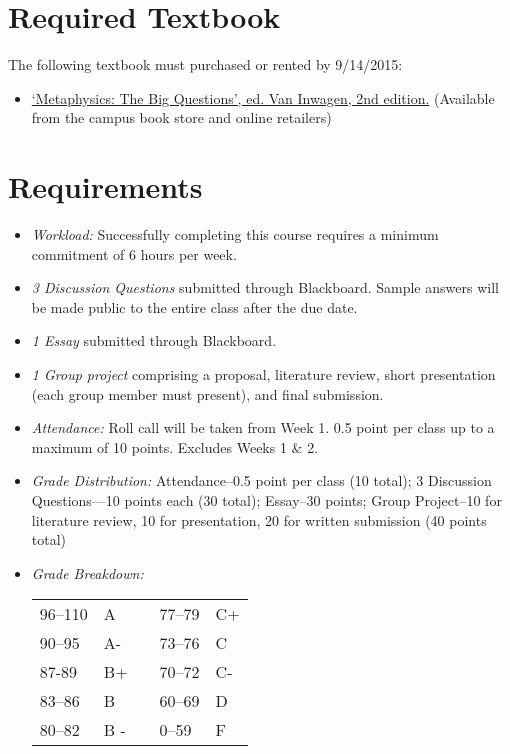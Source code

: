 \documentclass[11pt,article,oneside]{memoir}
\begin{document}
\section{Required Textbook}

The following textbook must purchased or rented by 9/14/2015:

\begin{itemize}
\item
\href{http://www.amazon.com/Metaphysics-Questions-Peter-van-Inwagen/dp/1405125861/ref=sr_1_1?ie=UTF8&qid=1440685163&sr=8-1&keywords=metaphysics+big+questions}{`Metaphysics: The Big Questions', ed. Van Inwagen, 2nd edition.} (Available from the campus book store and online retailers)
\end{itemize}

\section{Requirements}

\begin{itemize}
\item \textit{Workload:} Successfully completing this course requires a minimum commitment of 6 hours per week. 


\item \textit{3 Discussion Questions} submitted through Blackboard. Sample answers will be made public to the entire class after the due date. 

\item \textit{1 Essay} submitted through Blackboard. 
 
\item \textit{1 Group project} comprising a proposal, literature review, short presentation (each group member must present), and final submission. 

\item \textit{Attendance:} Roll call will be taken from Week 1. 0.5 point per class up to a maximum of 10 points. Excludes Weeks 1 \& 2.  

\item \textit{Grade Distribution:} Attendance--0.5 point per class (10 total); 3 Discussion Questions---10 points each (30 total); Essay--30 points; Group Project--10 for literature review, 10 for presentation, 20 for written submission (40 points total)

\item \textit{Grade Breakdown:}

 \begin{tabular}{ | l | l | p{2cm} | l | l | }
    \hline 
96--110 & A  & &  77--79 &  C+ \\  
90--95 & A- & &  73--76 & C \\
87-89 & B+ &  &  70--72 & C- \\ 
83--86 & B  & &  60--69 & D\\
80--82 & B - & & 0--59 & F\\ \hline
    \end{tabular}


\end{itemize}
\end{document}
